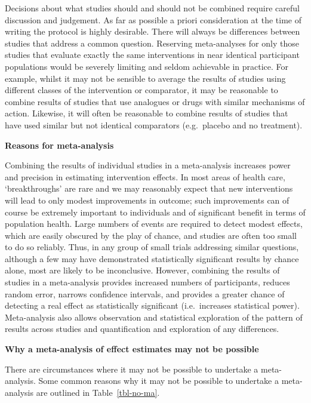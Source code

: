 \documentclass[
  11pt,
  a4paper,
  DIV=11,
  numbers=noendperiod]{scrreprt}
\begin{document}
Decisions about what studies should and should not be combined require
careful discussion and judgement. As far as possible a priori
consideration at the time of writing the protocol is highly desirable.
There will always be differences between studies that address a common
question. Reserving meta-analyses for only those studies that evaluate
exactly the same interventions in near identical participant populations
would be severely limiting and seldom achievable in practice. For
example, whilst it may not be sensible to average the results of studies
using different classes of the intervention or comparator, it may be
reasonable to combine results of studies that use analogues or drugs
with similar mechanisms of action. Likewise, it will often be reasonable
to combine results of studies that have used similar but not identical
comparators (e.g.~placebo and no treatment).

\textbf{Reasons for meta-analysis}

Combining the results of individual studies in a meta-analysis increases
power and precision in estimating intervention effects. In most areas of
health care, `breakthroughs' are rare and we may reasonably expect that
new interventions will lead to only modest improvements in outcome; such
improvements can of course be extremely important to individuals and of
significant benefit in terms of population health. Large numbers of
events are required to detect modest effects, which are easily obscured
by the play of chance, and studies are often too small to do so
reliably. Thus, in any group of small trials addressing similar
questions, although a few may have demonstrated statistically
significant results by chance alone, most are likely to be inconclusive.
However, combining the results of studies in a meta-analysis provides
increased numbers of participants, reduces random error, narrows
confidence intervals, and provides a greater chance of detecting a real
effect as statistically significant (i.e.~increases statistical power).
Meta-analysis also allows observation and statistical exploration of the
pattern of results across studies and quantification and exploration of
any differences.

\textbf{Why a meta-analysis of effect estimates may not be possible}

There are circumstances where it may not be possible to undertake a
meta-analysis. Some common reasons why it may not be possible to
undertake a meta-analysis are outlined in Table~\ref{tbl-no-ma}.
\end{document}
